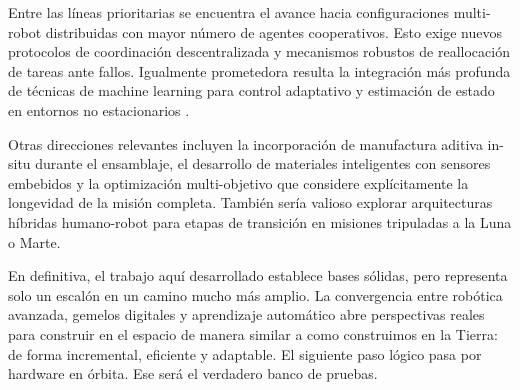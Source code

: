 Entre las líneas prioritarias se encuentra el avance hacia configuraciones multi-robot distribuidas con mayor número de agentes cooperativos. Esto exige nuevos protocolos de coordinación descentralizada y mecanismos robustos de reallocación de tareas ante fallos. Igualmente prometedora resulta la integración más profunda de técnicas de machine learning para control adaptativo y estimación de estado en entornos no estacionarios \cite{Alizadeh2024_Survey}.

Otras direcciones relevantes incluyen la incorporación de manufactura aditiva in-situ durante el ensamblaje, el desarrollo de materiales inteligentes con sensores embebidos y la optimización multi-objetivo que considere explícitamente la longevidad de la misión completa. También sería valioso explorar arquitecturas híbridas humano-robot para etapas de transición en misiones tripuladas a la Luna o Marte.

En definitiva, el trabajo aquí desarrollado establece bases sólidas, pero representa solo un escalón en un camino mucho más amplio. La convergencia entre robótica avanzada, gemelos digitales y aprendizaje automático abre perspectivas reales para construir en el espacio de manera similar a como construimos en la Tierra: de forma incremental, eficiente y adaptable. El siguiente paso lógico pasa por hardware en órbita. Ese será el verdadero banco de pruebas.